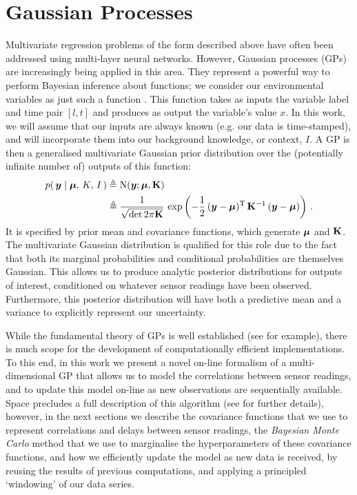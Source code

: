 \documentclass{acmtrans2m}
\begin{document}
\section{Gaussian Processes}\label{sec_gp}

\noindent Multivariate regression problems of the form described above have often been addressed using multi-layer neural networks. However, Gaussian processes (GPs) are increasingly being applied in this area. They represent a powerful way to perform Bayesian inference about functions; we consider our environmental variables as just such a function \cite{GPsBook}. This function takes as inputs the variable label and time pair $[l,t]$ and produces as output the variable's value $x$. In this work, we will assume that our inputs are always known (e.g. our data is time-stamped), and will incorporate them into our background knowledge, or context, $I$. A GP is then a generalised multivariate Gaussian prior distribution over the (potentially infinite number of) outputs of this function:
\small\begin{align}\label{eq:GPDefn}
p\!\left(\,\boldsymbol{y}\mid\boldsymbol{\mu},\,K,\,I\,\right) & \triangleq \text{N}\!\left(\boldsymbol{y};\boldsymbol{\mu},\mathbf{K}\right)\nonumber\\
& \triangleq\frac{1}{\sqrt{\det{2\pi\mathbf{K}}}}\,\exp \left(-\frac{1}{2}\,(\boldsymbol{y}-\boldsymbol{\mu})^{\mathrm{T}}\,\mathbf{K}^{-1}\,(\boldsymbol{y}-\boldsymbol{\mu})\right)\,.
\end{align}\normalsize
It is specified by prior mean and covariance functions, which generate $\boldsymbol{\mu}$ and $\mathbf{K}$.
 The multivariate Gaussian distribution is qualified for this role due to the fact that both its marginal probabilities and conditional probabilities are themselves Gaussian. This allows us to produce analytic posterior distributions for outputs of interest, conditioned on whatever sensor readings have been observed. Furthermore, this posterior distribution will have both a predictive mean and a variance to explicitly represent our uncertainty.

While the fundamental theory of GPs is well established (see  for example), there is much scope for the development of computationally efficient implementations. To this end, in this work we present a novel on-line formalism of a multi-dimensional GP that allows us to model the correlations between sensor readings, and to update this model on-line as new observations are sequentially available. Space precludes a full description of this algorithm (see \cite{gp_mike} for further details), however, in the next sections we describe the covariance functions that we use to represent correlations and delays between sensor readings, the {\em Bayesian Monte Carlo} method that we use to marginalise the hyperparameters of these covariance functions, and how we efficiently update the model as new data is received, by reusing the results of previous computations, and applying a principled `windowing' of our data series.
\end{document}
